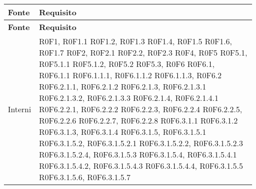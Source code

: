 \def\arraystretch{1.5}
\begin{longtable}{p{2.5cm}!{\VRule[1pt]}p{5.5cm}}
\color{white} \textbf{Fonte} & \color{white} \textbf{Requisito} \\ 
\endfirsthead 
{} 
\color{white} \textbf{Fonte} & \color{white} \textbf{Requisito} \\ 
\endhead 
Interni & R0F1, R0F1.1 \newline
R0F1.2, R0F1.3 \newline
R0F1.4, R0F1.5 \newline
R0F1.6, R0F1.7 \newline
R0F2, R0F2.1 \newline
R0F2.2, R0F2.3 \newline
R0F4, R0F5 \newline
R0F5.1, R0F5.1.1 \newline
R0F5.1.2, R0F5.2 \newline
R0F5.3, R0F6 \newline
R0F6.1, R0F6.1.1 \newline
R0F6.1.1.1, R0F6.1.1.2 \newline
R0F6.1.1.3, R0F6.2 \newline
R0F6.2.1.1, R0F6.2.1.2 \newline
R0F6.2.1.3, R0F6.2.1.3.1 \newline
R0F6.2.1.3.2, R0F6.2.1.3.3 \newline
R0F6.2.1.4, R0F6.2.1.4.1 \newline
R0F6.2.2.1, R0F6.2.2.2 \newline
R0F6.2.2.3, R0F6.2.2.4 \newline
R0F6.2.2.5, R0F6.2.2.6 \newline
R0F6.2.2.7, R0F6.2.2.8 \newline
R0F6.3.1.1 R0F6.3.1.2 \newline
R0F6.3.1.3, R0F6.3.1.4 \newline
R0F6.3.1.5, R0F6.3.1.5.1 \newline
R0F6.3.1.5.2, R0F6.3.1.5.2.1 \newline
R0F6.3.1.5.2.2, R0F6.3.1.5.2.3 \newline
R0F6.3.1.5.2.4, R0F6.3.1.5.3 \newline
R0F6.3.1.5.4, R0F6.3.1.5.4.1 \newline
R0F6.3.1.5.4.2, R0F6.3.1.5.4.3 \newline
R0F6.3.1.5.4.4, R0F6.3.1.5.5 \newline
R0F6.3.1.5.6, R0F6.3.1.5.7 \newline

\end{longtable}
